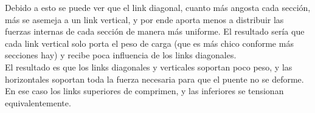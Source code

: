 Debido a esto se puede ver que el link diagonal, cuanto más angosta cada sección, más se asemeja a un link vertical, y por ende aporta menos a distribuir las fuerzas internas de cada sección de manera más uniforme. El resultado sería que cada link vertical solo porta el peso de carga (que es más chico conforme más secciones hay) y recibe poca influencia de los links diagonales.\\

El resultado es que los links diagonales y verticales soportan poco peso, y las horizontales soportan toda la fuerza necesaria para que el puente no se deforme.\\

En ese caso los links superiores de comprimen, y las inferiores se tensionan equivalentemente.